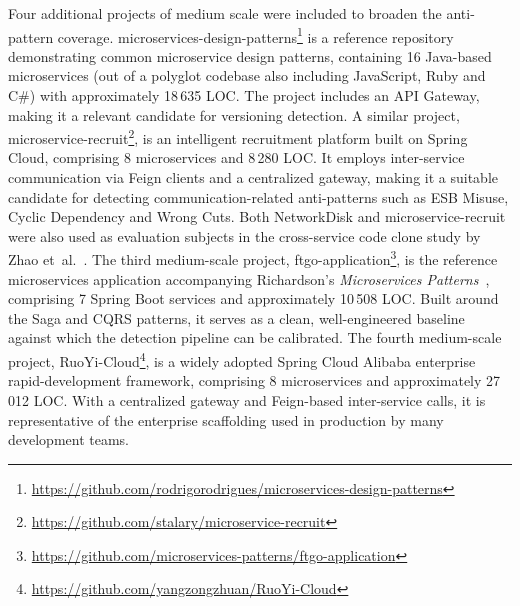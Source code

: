\par Four additional projects of medium scale were included to broaden the anti-pattern coverage. microservices-design-patterns\footnote{\url{https://github.com/rodrigorodrigues/microservices-design-patterns}} is a reference repository demonstrating common microservice design patterns, containing 16 Java-based microservices (out of a polyglot codebase also including JavaScript, Ruby and C\#) with approximately 18\,635 LOC. The project includes an API Gateway, making it a relevant candidate for versioning detection. A similar project, microservice-recruit\footnote{\url{https://github.com/stalary/microservice-recruit}}, is an intelligent recruitment platform built on Spring Cloud, comprising 8 microservices and 8\,280 LOC. It employs inter-service communication via Feign clients and a centralized gateway, making it a suitable candidate for detecting communication-related anti-patterns such as ESB Misuse, Cyclic Dependency and Wrong Cuts. Both NetworkDisk and microservice-recruit were also used as evaluation subjects in the cross-service code clone study by Zhao et~al.~\cite{10.1145/3524610.3527925}. The third medium-scale project, ftgo-application\footnote{\url{https://github.com/microservices-patterns/ftgo-application}}, is the reference microservices application accompanying Richardson's \textit{Microservices Patterns}~\cite{Richardson2018}, comprising 7 Spring Boot services and approximately 10\,508 LOC. Built around the Saga and CQRS patterns, it serves as a clean, well-engineered baseline against which the detection pipeline can be calibrated. The fourth medium-scale project, RuoYi-Cloud\footnote{\url{https://github.com/yangzongzhuan/RuoYi-Cloud}}, is a widely adopted Spring Cloud Alibaba enterprise rapid-development framework, comprising 8 microservices and approximately 27\,012 LOC. With a centralized gateway and Feign-based inter-service calls, it is representative of the enterprise scaffolding used in production by many development teams.

